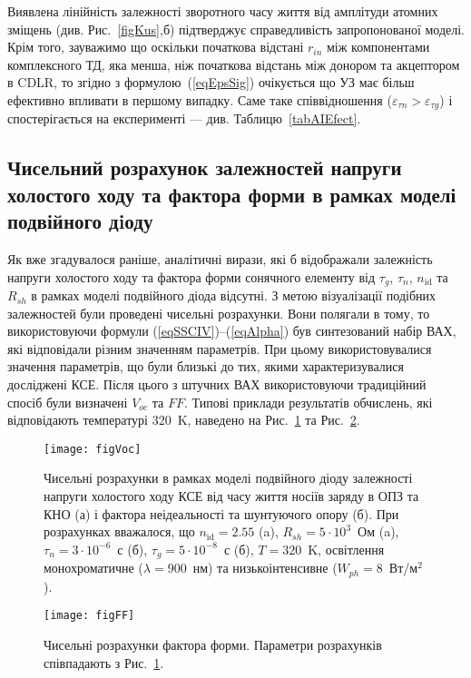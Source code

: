 Виявлена лінійність залежності зворотного часу життя від амплітуди атомних зміщень (див. Рис.~\ref{figKus},б) підтверджує
справедливість запропонованої моделі.
Крім того, зауважимо що оскільки початкова відстані $r_{in}$ між компонентами комплексного ТД, яка  менша, ніж початкова відстань між донором та акцептором в CDLR,
то згідно з формулою~(\ref{eqEpsSig}) очікується що УЗ має більш ефективно впливати в першому випадку.
Саме таке співвідношення ($\varepsilon_{\tau n}>\varepsilon_{\tau g}$) і спостерігається на експерименті --- див. Таблицю~\ref{tabAIEfect}.


\subsection{Чисельний розрахунок залежностей напруги холостого ходу та фактора форми в рамках моделі подвійного дiоду\label{sbVocSim}}


Як вже згадувалося раніше,
аналітичні вирази, які б відображали залежність напруги холостого ходу та фактора форми сонячного елементу
від $\tau_g$, $\tau_n$, $n_{\mathrm{id}}$ та $R_{sh}$ в рамках  моделі подвійного діода відсутні.
З метою візуалізації подібних залежностей були проведені чисельні розрахунки.
Вони полягали в тому, то використовуючи
формули (\ref{eqSSCIV})--(\ref{eqAlpha}) був синтезований набір ВАХ, які відповідали різним
значенням параметрів.
При цьому використовувалися значення параметрів, що були близькі до тих, якими характеризувалися досліджені КСЕ.
Після цього з штучних ВАХ використовуючи традиційний спосіб були визначені $V_{oc}$ та $F\!F$.
Типові приклади результатів обчислень, які відповідають температурі 320~K, наведено на Рис.~\ref{figVoc} та Рис.~\ref{figFF}.


\begin{figure}[b]
\center
\texttt{[image: figVoc]}
\caption{\label{figVoc}
Чисельні розрахунки
в рамках моделі подвійного діоду залежності напруги холостого ходу КСЕ від часу життя носіїв заряду в ОПЗ та КНО (а) і
фактора неідеальності та шунтуючого опору (б).
При розрахунках вважалося, що $n_\mathrm{id}=2.55$ (a), $R_{sh}=5\cdot10^3$~Ом (a), $\tau_n=3\cdot10^{-6}$~с (б), $\tau_g=5\cdot10^{-8}$~с (б), $T=320$~K,
освітлення монохроматичне ($\lambda=900$~нм) та низькоінтенсивне ($W_{ph}=8$~Вт/м$^2$).
}%
\end{figure}


\begin{figure}
\center
\texttt{[image: figFF]}
\caption{\label{figFF}
Чисельні розрахунки фактора форми.
Параметри розрахунків співпадають з Рис.~\ref{figVoc}.
}%
\end{figure}

